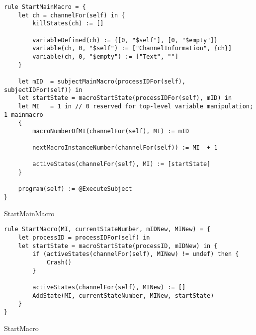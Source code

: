 \begin{listing}[H]
\begin{verbatim}
rule StartMainMacro = {
    let ch = channelFor(self) in {
        killStates(ch) := []

        variableDefined(ch) := {[0, "$self"], [0, "$empty"]}
        variable(ch, 0, "$self") := ["ChannelInformation", {ch}]
        variable(ch, 0, "$empty") := ["Text", ""]
    }

    let mID  = subjectMainMacro(processIDFor(self), subjectIDFor(self)) in
    let startState = macroStartState(processIDFor(self), mID) in
    let MI   = 1 in // 0 reserved for top-level variable manipulation; 1 mainmacro
    {
        macroNumberOfMI(channelFor(self), MI) := mID

        nextMacroInstanceNumber(channelFor(self)) := MI  + 1

        activeStates(channelFor(self), MI) := [startState]
    }

    program(self) := @ExecuteSubject
}
\end{verbatim}
\caption{StartMainMacro}
\label{lst:asm:StartMainMacro}
\end{listing}




\begin{listing}[H]
\begin{verbatim}
rule StartMacro(MI, currentStateNumber, mIDNew, MINew) = {
    let processID = processIDFor(self) in
    let startState = macroStartState(processID, mIDNew) in {
        if (activeStates(channelFor(self), MINew) != undef) then {
            Crash()
        }

        activeStates(channelFor(self), MINew) := []
        AddState(MI, currentStateNumber, MINew, startState)
    }
}
\end{verbatim}
\caption{StartMacro}
\label{lst:asm:StartMacro}
\end{listing}




